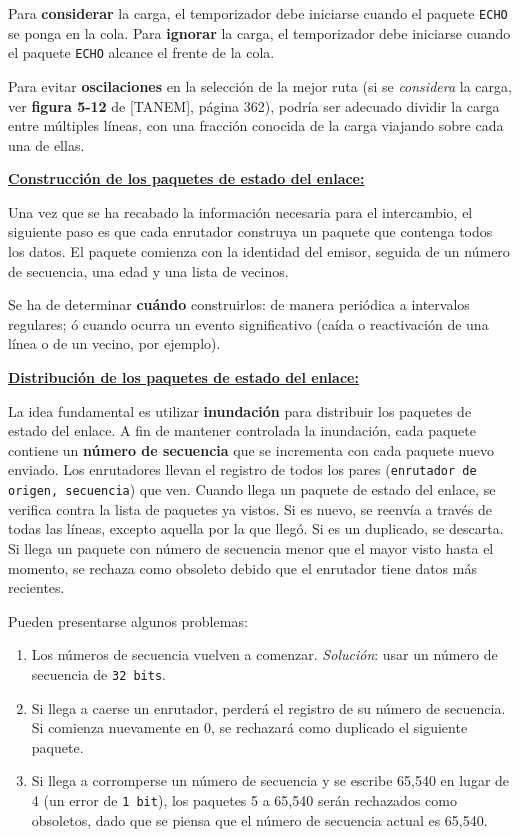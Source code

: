 \documentclass[10pt,a4paper]{article}
\begin{document}
Para \textbf{considerar} la carga, el temporizador debe iniciarse cuando el paquete \texttt{ECHO} se ponga en la cola. Para \textbf{ignorar} la carga, el temporizador debe iniciarse cuando el paquete \texttt{ECHO} alcance el frente de la cola.

Para evitar \textbf{oscilaciones} en la selección de la mejor ruta (si se \textit{considera} la carga, ver \textbf{figura 5-12} de [TANEM], página 362), podría ser adecuado dividir la carga entre múltiples líneas, con una fracción conocida de la carga viajando sobre cada una de ellas.

\underline{\textbf{Construcción de los paquetes de estado del enlace:}}

Una vez que se ha recabado la información necesaria para el intercambio, el siguiente paso es que cada enrutador construya un paquete que contenga todos los datos. El paquete comienza con la identidad del emisor, seguida de un número de secuencia, una edad y una lista de vecinos.

Se ha de determinar \textbf{cuándo} construirlos: de manera periódica a intervalos regulares; ó cuando ocurra un evento significativo (caída o reactivación de una línea o de un vecino, por ejemplo).

\underline{\textbf{Distribución de los paquetes de estado del enlace:}}

La idea fundamental es utilizar \textbf{inundación} para distribuir los paquetes de estado del enlace. A fin de mantener controlada la inundación, cada paquete contiene un \textbf{número de secuencia} que se incrementa con cada paquete nuevo enviado. Los enrutadores llevan el registro de todos los pares (\texttt{enrutador de origen, secuencia}) que ven. Cuando llega un paquete de estado del enlace, se verifica contra la lista de paquetes ya vistos. Si es nuevo, se reenvía a través de todas las líneas, excepto aquella por la que llegó. Si es un duplicado, se descarta. Si llega un paquete con número de secuencia menor que el mayor visto hasta el momento, se rechaza como obsoleto debido que el enrutador tiene datos más recientes.

Pueden presentarse algunos problemas:
\begin{enumerate}
\item Los números de secuencia vuelven a comenzar. \textit{Solución}: usar un número de secuencia de \texttt{32 bits}.
\item Si llega a caerse un enrutador, perderá el registro de su número de secuencia. Si comienza nuevamente en 0, se rechazará como duplicado el siguiente paquete.
\item Si llega a corromperse un número de secuencia y se escribe 65,540 en lugar de 4 (un error de \texttt{1 bit}), los paquetes 5 a 65,540 serán rechazados como obsoletos, dado que se piensa que el número de secuencia actual es 65,540.
\end{enumerate}
\end{document}
